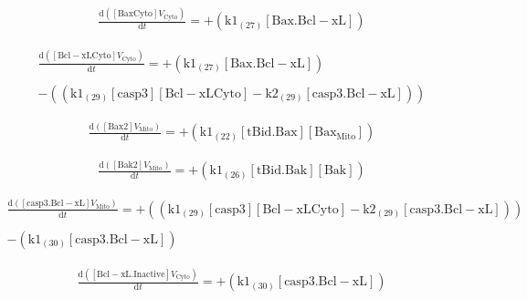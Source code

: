 \documentclass[a4paper,12pt]{article} %
\newcommand{\M}[1]{\mathrm{#1}}
\begin{document}
\begin{equation}
\begin{split}
\frac {\M{d}( {{\M{[Bax{Cyto}]}}    {V}_{\M{Cyto}} } ) }  {\M{d}{t} }  =  {  +  ( {{\M{k1}}_{\M{(27)}}    {\M{[Bax.Bcl-xL]}} } ) }
\end{split}
\end{equation}

\begin{equation}
\begin{split}
\frac {\M{d}( {{\M{[Bcl-xL{Cyto}]}}    {V}_{\M{Cyto}} } ) }  {\M{d}{t} }  =  {  +  ( {{\M{k1}}_{\M{(27)}}    {\M{[Bax.Bcl-xL]}} } ) } \\ 
  \\ 
   {  -  (( {{\M{k1}}_{\M{(29)}}    {\M{[casp3]}}    {\M{[Bcl-xL{Cyto}]}}  -  {\M{k2}}_{\M{(29)}}    {\M{[casp3.Bcl-xL]}} } )) }
\end{split}
\end{equation}

\begin{equation}
\begin{split}
\frac {\M{d}( {{\M{[Bax2]}}    {V}_{\M{Mito}} } ) }  {\M{d}{t} }  =  {  +  ( {{\M{k1}}_{\M{(22)}}    {\M{[tBid.Bax]}}    {\M{[Bax_{Mito}]}} } ) }
\end{split}
\end{equation}

\begin{equation}
\begin{split}
\frac {\M{d}( {{\M{[Bak2]}}    {V}_{\M{Mito}} } ) }  {\M{d}{t} }  =  {  +  ( {{\M{k1}}_{\M{(26)}}    {\M{[tBid.Bak]}}    {\M{[Bak]}} } ) }
\end{split}
\end{equation}

\begin{equation}
\begin{split}
\frac {\M{d}( {{\M{[casp3.Bcl-xL]}}    {V}_{\M{Mito}} } ) }  {\M{d}{t} }  =  {  +  (( {{\M{k1}}_{\M{(29)}}    {\M{[casp3]}}    {\M{[Bcl-xL{Cyto}]}}  -  {\M{k2}}_{\M{(29)}}    {\M{[casp3.Bcl-xL]}} } )) } \\ 
  \\ 
   {  -  ( {{\M{k1}}_{\M{(30)}}    {\M{[casp3.Bcl-xL]}} } ) } 
\end{split}
\end{equation}


\begin{equation}
\begin{split}
\frac {\M{d}( {{\M{[Bcl-xL.Inactive]}}    {V}_{\M{Cyto}} } ) }  {\M{d}{t} }  =  {  +  ( {{\M{k1}}_{\M{(30)}}    {\M{[casp3.Bcl-xL]}} } ) } 
\end{split}
\end{equation}
\end{document}
